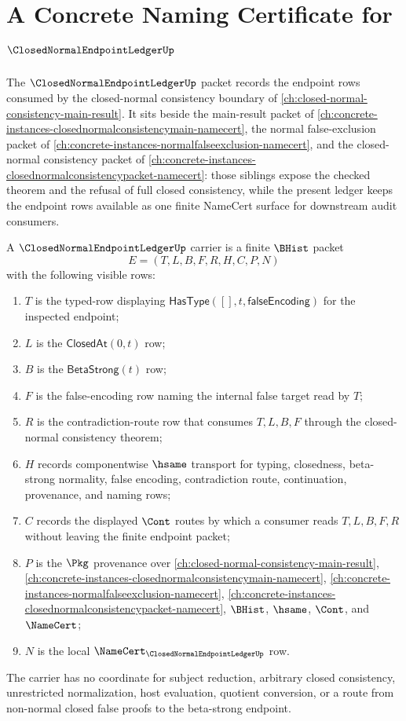 \chapter{A Concrete Naming Certificate for $\ClosedNormalEndpointLedgerUp$}
\label{ch:concrete-instances-closednormalendpointledger-namecert}

The $\ClosedNormalEndpointLedgerUp$ packet records the endpoint rows consumed by the closed-normal consistency boundary of \autoref{ch:closed-normal-consistency-main-result}. It sits beside the main-result packet of \autoref{ch:concrete-instances-closednormalconsistencymain-namecert}, the normal false-exclusion packet of \autoref{ch:concrete-instances-normalfalseexclusion-namecert}, and the closed-normal consistency packet of \autoref{ch:concrete-instances-closednormalconsistencypacket-namecert}: those siblings expose the checked theorem and the refusal of full closed consistency, while the present ledger keeps the endpoint rows available as one finite NameCert surface for downstream audit consumers.

\begin{definition}
\label{def:closed-normal-endpoint-ledger-carrier}
A $\ClosedNormalEndpointLedgerUp$ carrier is a finite $\BHist$ packet
$$
E=(T,L,B,F,R,H,C,P,N)
$$
with the following visible rows:
\begin{enumerate}
\item $T$ is the typed-row displaying $\mathsf{HasType}([],t,\mathsf{falseEncoding})$ for the inspected endpoint;
\item $L$ is the $\mathsf{ClosedAt}(0,t)$ row;
\item $B$ is the $\mathsf{BetaStrong}(t)$ row;
\item $F$ is the false-encoding row naming the internal false target read by $T$;
\item $R$ is the contradiction-route row that consumes $T,L,B,F$ through the closed-normal consistency theorem;
\item $H$ records componentwise $\hsame$ transport for typing, closedness, beta-strong normality, false encoding, contradiction route, continuation, provenance, and naming rows;
\item $C$ records the displayed $\Cont$ routes by which a consumer reads $T,L,B,F,R$ without leaving the finite endpoint packet;
\item $P$ is the $\Pkg$ provenance over \autoref{ch:closed-normal-consistency-main-result}, \autoref{ch:concrete-instances-closednormalconsistencymain-namecert}, \autoref{ch:concrete-instances-normalfalseexclusion-namecert}, \autoref{ch:concrete-instances-closednormalconsistencypacket-namecert}, $\BHist$, $\hsame$, $\Cont$, and $\NameCert$;
\item $N$ is the local $\NameCert_{\ClosedNormalEndpointLedgerUp}$ row.
\end{enumerate}
The carrier has no coordinate for subject reduction, arbitrary closed consistency, unrestricted normalization, host evaluation, quotient conversion, or a route from non-normal closed false proofs to the beta-strong endpoint.
\end{definition}

